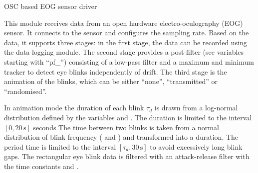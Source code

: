 OSC based EOG sensor driver


This module receives data from an open hardware electro-oculography (EOG) sensor. It connects to the sensor and configures the sampling rate. Based on the data, it supports three stages: in the first stage, the data can be recorded using the data logging module. The second stage provides a post-filter (see variables starting with ``pf\_'') consisting of a low-pass filter and a maximum and minimum tracker to detect eye blinks independently of drift. The third stage is the animation of the blinks, which can be either ``none'', ``transmitted'' or ``randomised''.





In animation mode the duration of each blink $\tau_{d}$ is drawn from a log-normal distribution defined by the variables  and . The duration is limited to the interval $[0,20\,\textrm{s}]$ seconds The time between two blinks is taken from a normal distribution of blink frequency ( and ) and transformed into a duration. The period time is limited to the interval $[\tau_{d},30\,\textrm{s}]$ to avoid excessively long blink gaps. The rectangular eye blink data is filtered with an attack-release filter with the time constants  and .
